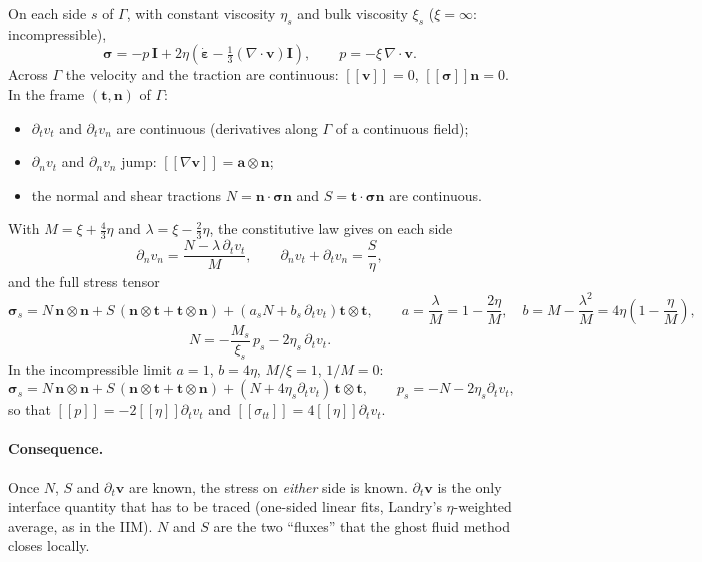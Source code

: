 \documentclass[11pt,a4paper]{article}
\newcommand{\jump}[1]{[\![#1]\!]}
\begin{document}
On each side $s$ of $\Gamma$, with constant viscosity $\eta_s$ and bulk viscosity $\xi_s$
($\xi=\infty$: incompressible),
\[
\boldsymbol\sigma=-p\,\mathbf I+2\eta\left(\dot{\boldsymbol\varepsilon}-\tfrac13(\nabla\cdot\mathbf v)\mathbf I\right),\qquad
p=-\xi\,\nabla\cdot\mathbf v .
\]
Across $\Gamma$ the velocity and the traction are continuous: $\jump{\mathbf v}=0$,
$\jump{\boldsymbol\sigma}\mathbf n=0$. In the frame $(\mathbf t,\mathbf n)$ of $\Gamma$:
\begin{itemize}
  \item $\partial_t v_t$ and $\partial_t v_n$ are continuous (derivatives along $\Gamma$ of a
    continuous field);
  \item $\partial_n v_t$ and $\partial_n v_n$ jump: $\jump{\nabla\mathbf v}=\mathbf a\otimes\mathbf n$;
  \item the normal and shear tractions $N=\mathbf n\cdot\boldsymbol\sigma\mathbf n$ and
    $S=\mathbf t\cdot\boldsymbol\sigma\mathbf n$ are continuous.
\end{itemize}
With $M=\xi+\tfrac43\eta$ and $\lambda=\xi-\tfrac23\eta$, the constitutive law gives on each
side
\[
\partial_n v_n=\frac{N-\lambda\,\partial_t v_t}{M},\qquad
\partial_n v_t+\partial_t v_n=\frac{S}{\eta},
\]
and the full stress tensor
\begin{equation}\label{eq:sides}
\boldsymbol\sigma_s=N\,\mathbf n\otimes\mathbf n+S\,(\mathbf n\otimes\mathbf t+\mathbf t\otimes\mathbf n)
+\left(a_sN+b_s\,\partial_t v_t\right)\mathbf t\otimes\mathbf t,\qquad
a=\frac{\lambda}{M}=1-\frac{2\eta}{M},\quad b=M-\frac{\lambda^2}{M}=4\eta\left(1-\frac{\eta}{M}\right),
\end{equation}
\[
N=-\frac{M_s}{\xi_s}\,p_s-2\eta_s\,\partial_t v_t .
\]
In the incompressible limit $a=1$, $b=4\eta$, $M/\xi=1$, $1/M=0$:
\[
\boldsymbol\sigma_s=N\,\mathbf n\otimes\mathbf n+S\,(\mathbf n\otimes\mathbf t+\mathbf t\otimes\mathbf n)
+(N+4\eta_s\partial_t v_t)\,\mathbf t\otimes\mathbf t,\qquad p_s=-N-2\eta_s\partial_t v_t,
\]
so that $\jump{p}=-2\jump{\eta}\partial_t v_t$ and $\jump{\sigma_{tt}}=4\jump{\eta}\partial_t v_t$.

\paragraph{Consequence.} Once $N$, $S$ and $\partial_t\mathbf v$ are known, the stress on
\emph{either} side is known. $\partial_t\mathbf v$ is the only interface quantity that has to be
traced (one-sided linear fits, Landry's $\eta$-weighted average, as in the IIM). $N$ and $S$ are
the two ``fluxes'' that the ghost fluid method closes locally.
\end{document}
